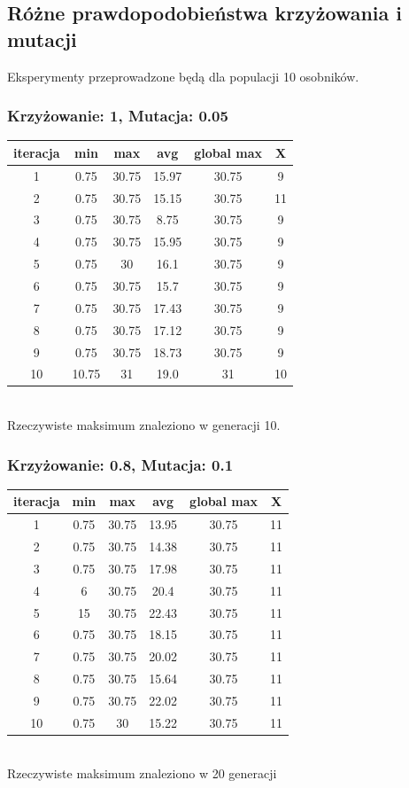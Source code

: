 \documentclass[a4paper,11pt]{article}
\begin{document}
			\subsection{Różne prawdopodobieństwa krzyżowania i mutacji}
				Eksperymenty przeprowadzone będą dla populacji 10 osobników.
				\subsubsection{Krzyżowanie: 1, Mutacja: 0.05}
				\begin{tabular}{|c|c|c|c|c|c|}
					\hline 
					iteracja &  min &  max & avg & global max &  X\\
					\hline
					1 & 0.75 & 30.75 & 15.97 & 30.75 & 9\\
					\hline
					2 & 0.75 & 30.75 & 15.15 & 30.75 & 11\\
					\hline
					3 & 0.75 & 30.75 & 8.75 & 30.75 & 9\\
					\hline
					4 & 0.75 & 30.75 & 15.95 & 30.75 & 9\\
					\hline
					5 & 0.75 & 30 & 16.1 & 30.75 & 9\\
					\hline
					6 & 0.75 & 30.75 & 15.7 & 30.75 & 9\\
					\hline
					7 & 0.75 & 30.75 & 17.43 & 30.75 & 9\\
					\hline
					8 & 0.75 & 30.75 & 17.12 & 30.75 & 9\\
					\hline
					9 & 0.75 & 30.75 & 18.73 & 30.75 & 9\\
					\hline
					10 & 10.75 & 31 & 19.0 & 31 & 10\\
					\hline
				\end{tabular} \\
				Rzeczywiste maksimum znaleziono w generacji 10.
				\subsubsection{Krzyżowanie: 0.8, Mutacja: 0.1}
				\begin{tabular}{|c|c|c|c|c|c|}
					\hline 
					iteracja &  min &  max & avg & global max &  X\\
					\hline
					1 & 0.75 & 30.75 & 13.95 & 30.75 & 11\\
					\hline
					2 & 0.75 & 30.75 & 14.38 & 30.75 & 11\\
					\hline
					3 & 0.75 & 30.75 & 17.98 & 30.75 & 11\\
					\hline
					4 & 6 & 30.75 & 20.4 & 30.75 & 11\\
					\hline
					5 & 15 & 30.75 & 22.43 & 30.75 & 11\\
					\hline
					6 & 0.75 & 30.75 & 18.15 & 30.75 & 11\\
					\hline
					7 & 0.75 & 30.75 & 20.02 & 30.75 & 11\\
					\hline
					8 & 0.75 & 30.75 & 15.64 & 30.75 & 11\\
					\hline
					9 & 0.75 & 30.75 & 22.02 & 30.75 & 11\\
					\hline
					10 & 0.75 & 30 & 15.22 & 30.75 & 11\\
					\hline
				\end{tabular}\\
				Rzeczywiste maksimum znaleziono w 20 generacji
\end{document}
